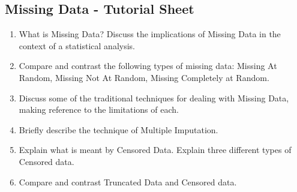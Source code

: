 \documentclass[a4paper,12pt]{article}
\begin{document}
\subsection*{Missing Data - Tutorial Sheet}%
\begin{enumerate}
	\item What is Missing Data? Discuss the implications of Missing Data in the context of a statistical analysis.
	\item Compare and contrast the following types of missing data: Missing At Random, Missing Not At Random, Missing Completely at Random.
	\item Discuss some of the traditional techniques for dealing with Missing Data, making reference to the limitations of each.
	\item Briefly describe the technique of Multiple Imputation.
\item Explain what is meant by Censored Data. Explain three different types of Censored data.
\item Compare and contrast Truncated Data and Censored data.
\end{enumerate}
\end{document}
